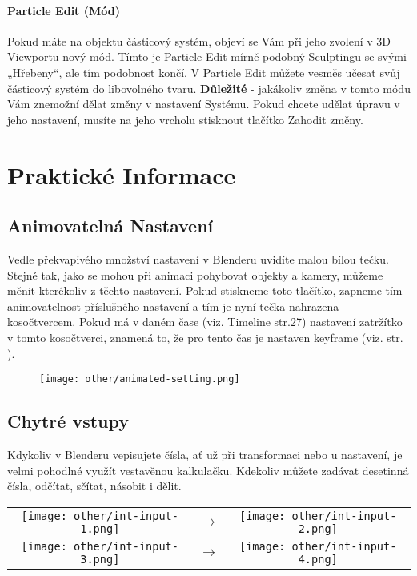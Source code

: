 \documentclass[12pt,a4paper]{report}
\begin{document}
	\paragraph{Particle Edit (Mód)} Pokud máte na objektu částicový systém, objeví
	se Vám při jeho zvolení v 3D Viewportu nový mód. Tímto je Particle Edit
	mírně podobný Sculptingu se svými „Hřebeny“, ale tím podobnost končí.
	V Particle Edit můžete vesměs učesat svůj částicový systém do
	libovolného tvaru. \textbf{Důležité} - jakákoliv změna v tomto módu Vám
	znemožní dělat změny v nastavení Systému. Pokud chcete udělat úpravu
	v jeho nastavení, musíte na jeho vrcholu stisknout tlačítko Zahodit
	změny.
	
	\section{Praktické Informace}
	\subsection{Animovatelná Nastavení}
	\label{section:animated-settings}
	Vedle překvapivého množství nastavení v Blenderu uvidíte malou bílou
	tečku. Stejně tak, jako se mohou při animaci pohybovat objekty
	a kamery, můžeme měnit kterékoliv z těchto nastavení. Pokud stiskneme
	toto tlačítko, zapneme tím animovatelnost příslušného nastavení a tím je
	nyní tečka nahrazena kosočtvercem. Pokud má v daném čase (viz.
	Timeline str.27) nastavení zatržítko v tomto kosočtverci, znamená to, že
	pro tento čas je nastaven keyframe (viz.  str. \pageref{section:keyframing}).
	\begin{figure}
		\centering
		\texttt{[image: other/animated-setting.png]}
		\caption{}
		\label{pic:animated-setting}
	\end{figure}

	\subsection{Chytré vstupy}
	Kdykoliv v Blenderu vepisujete čísla, ať už při transformaci nebo u
	nastavení, je velmi pohodlné využít vestavěnou kalkulačku. Kdekoliv
	můžete zadávat desetinná čísla, odčítat, sčítat, násobit i dělit.

{\centering
	\begin{tabular}{ccc}
		\texttt{[image: other/int-input-1.png]} & $\rightarrow$ & \texttt{[image: other/int-input-2.png]} \\ \texttt{[image: other/int-input-3.png]} & $\rightarrow$ & \texttt{[image: other/int-input-4.png]}
	\end{tabular}}
\end{document}
